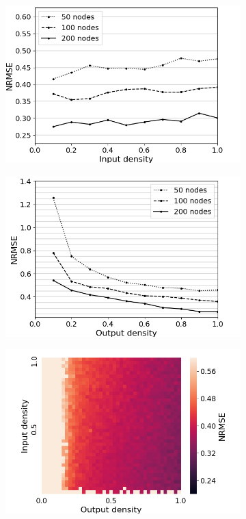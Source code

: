 \begin{figure}[htbp]
  \centering
  \begin{subfigure}{.3\textwidth}
    \centering
    \includegraphics[width=\linewidth]{img/input_density_all.png}
    \caption{}
  \end{subfigure}
  \begin{subfigure}{.3\textwidth}
    \centering
    \includegraphics[width=\linewidth]{img/output_density_all.png}
    \caption{}
  \end{subfigure}
  \begin{subfigure}{.3\textwidth}
    \centering
    \includegraphics[width=\linewidth]{img/partial_visibility.png}

\end{subfigure}
\end{figure}
